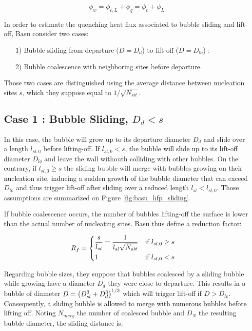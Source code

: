 \begin{equation}
\phi_{w} = \phi_{c,L}+\phi_{q} = \phi_{e} + \phi_{L}
\label{eq:basu_hfp_phitot}
\end{equation}

In order to estimate the quenching heat flux associated to bubble sliding and lift-off, Basu \etal consider two cases: 

\begin{itemize}
\item[1)] Bubble sliding from departure ($D=D_{d}$) to lift-off ($D=D_{lo}$) ;
\item[2)] Bubble coalescence with neighboring sites before departure.
\end{itemize} 

Those two cases are distinguished using the average distance between nucleation sites $s$, which they suppose equal to $1/\sqrt{N_{sit}}$.

\subsection{Case 1 : Bubble Sliding, $D_{d}<s$}

In this case, the bubble will grow up to its departure diameter $D_{d}$ and slide over a length $l_{sl,0}$ before lifting-off. If $l_{sl,0}<s$, the bubble will slide up to its lift-off diameter $D_{lo}$ and leave the wall withouth colliding with other bubbles. On the contrary, if $l_{sl,0}\geq s$ the sliding bubble will merge with bubbles growing on their nucleation site, inducing a sudden growth of the bubble diameter that can exceed $D_{lo}$ and thus trigger lift-off after sliding over a reduced length $l_{sl}<l_{sl,0}$. Those assumptions are summarized on Figure \ref{fig:basu_hfp_sliding}.

\npar
If bubble coalescence occurs, the number of bubbles lifting-off the surface is lower than the actual number of nucleating sites. Basu \etal thus define a reduction factor:

\begin{align}
R_{f}&=
\begin{dcases}
\dfrac{s}{l_{sl}} = \dfrac{1}{l_{sl}\sqrt{N_{sit}}} & \text{if } l_{sl,0} \geq s \\
1 & \text{if } l_{sl,0}<s
\end{dcases}
\label{eq:basu_hfp_Rf}
\end{align}  


Regarding bubble sizes, they suppose that bubbles coalesced by a sliding bubble while growing have a diameter $D_{d}$ \ie they were close to departure. %
This results in a bubble of diameter $D=\left( D_{sl}^{3} + D_{d}^{3} \right)^{1/3}$ which will trigger lift-off if $D>D_{lo}$. Consequently, a sliding bubble is allowed to merge with numerous bubbles before lifting off. Noting $N_{merg}$ the number of coalesced bubble and $D_{N}$ the resulting bubble diameter, the sliding distance is:

